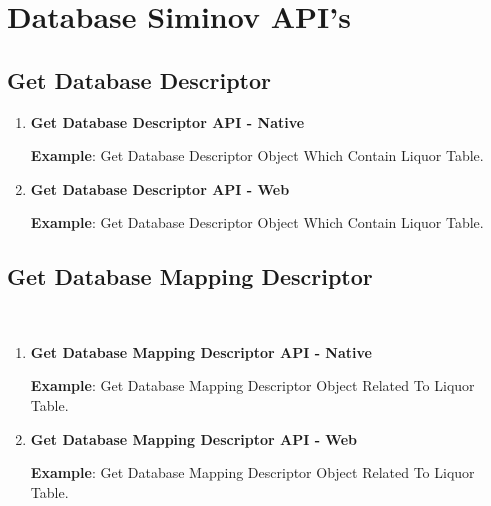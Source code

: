	

\section{Database Siminov API's}


	\subsection{Get Database Descriptor}

		\begin{enumerate}

			\item \small \textbf{Get Database Descriptor API - Native}
				

				\par
				\textbf{Example}: Get Database Descriptor Object Which Contain Liquor Table.
					

			\item \small \textbf{Get Database Descriptor API - Web}
				

				\par
				\textbf{Example}: Get Database Descriptor Object Which Contain Liquor Table.
					

		\end{enumerate}



	\subsection{Get Database Mapping Descriptor}\
	
		\begin{enumerate}

			\item \small \textbf{Get Database Mapping Descriptor API - Native}
				

				\par
				\textbf{Example}: Get Database Mapping Descriptor Object Related To Liquor Table.
					

			\item \small \textbf{Get Database Mapping Descriptor API - Web}
				

				\par
				\textbf{Example}: Get Database Mapping Descriptor Object Related To Liquor Table.
					

		\end{enumerate}





